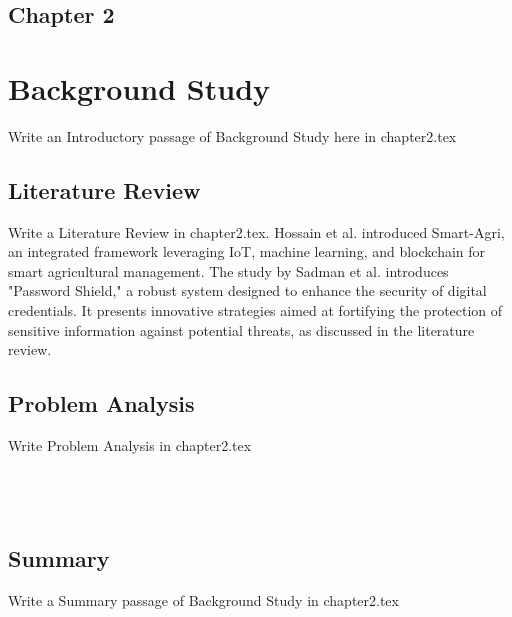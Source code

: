 \begin{center}
    \section*{\fontsize{20}{20}\selectfont Chapter 2}
\end{center}
\vspace{10mm}
\section{Background Study}

Write an Introductory passage of Background Study here in chapter2.tex

\subsection{Literature Review}
Write a Literature Review in chapter2.tex.
Hossain et al. \cite{hossain2023smart} introduced Smart-Agri, an integrated framework leveraging IoT, machine learning, and blockchain for smart agricultural management. The study by Sadman et al. \cite{sadman2023password} introduces "Password Shield," a robust system designed to enhance the security of digital credentials. It presents innovative strategies aimed at fortifying the protection of sensitive information against potential threats, as discussed in the literature review.

\subsection{Problem Analysis}
Write Problem Analysis in chapter2.tex
\\
\\
\\
\\
\subsection*{Summary}
Write a Summary passage of Background Study in chapter2.tex